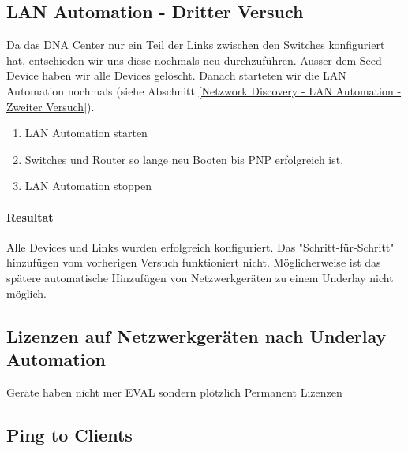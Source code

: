 \subsection{LAN Automation - Dritter Versuch}
Da das DNA Center nur ein Teil der Links zwischen den Switches konfiguriert hat, entschieden wir uns diese nochmals neu durchzuführen. Ausser dem Seed Device haben wir alle Devices gelöscht. Danach starteten wir die LAN Automation nochmals (siehe Abschnitt \ref{Netzwork Discovery - LAN Automation - Zweiter Versuch}).

\begin{enumerate}
	\item LAN Automation starten
	\item Switches und Router so lange neu Booten bis PNP erfolgreich ist.
	\item LAN Automation stoppen
\end{enumerate}

\paragraph{Resultat}
Alle Devices und Links wurden erfolgreich konfiguriert. Das "Schritt-für-Schritt" hinzufügen vom vorherigen Versuch funktioniert nicht. Möglicherweise ist das spätere automatische Hinzufügen von Netzwerkgeräten zu einem Underlay nicht möglich. 

\subsection{Lizenzen auf Netzwerkgeräten nach Underlay Automation}
Geräte haben nicht mer EVAL sondern plötzlich Permanent Lizenzen

\subsection{Ping to Clients}





